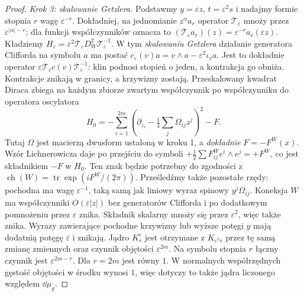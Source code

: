 \begin{proof}
\emph{Krok 3: skalowanie Getzlera.}
Podstawmy \(y=\varepsilon z\),
\(t=\varepsilon^2s\) i nadajmy formie stopnia
\(r\) wagę \(\varepsilon^{-r}\).
Dokładniej, na jednomianie \(z^\alpha a_r\)
operator \(\mathcal T_\varepsilon\) mnoży przez
\(\varepsilon^{|\alpha|-r}\);
dla funkcji współczynników oznacza to
$(\mathcal T_\varepsilon a_r)(z)=\varepsilon^{-r}a_r(\varepsilon z)$.
Kładziemy
\(H_\varepsilon=\varepsilon^2\mathcal T_\varepsilon
D_W^2\mathcal T_\varepsilon^{-1}\).
W tym
\emph{skalowaniu Getzlera} działanie generatora
Clifforda na symbolu \(a\) ma postać
\(c_\varepsilon(v)a=v\wedge a
-\varepsilon^2\iota_v a\).
Jest to dokładnie operator
$\varepsilon\mathcal T_\varepsilon c(v)\mathcal T_\varepsilon^{-1}$:
klin podnosi stopień o jeden, a kontrakcja go obniża.
Kontrakcje znikają w granicy, a krzywizny zostają.
Przeskalowany kwadrat Diraca zbiega na każdym
zbiorze zwartym współczynnik po współczynniku
do operatora oscylatora
\[
 H_0=-\sum_{i=1}^{2m}
       \left(\partial_{z_i}
          -\tfrac14\sum_j\Omega_{ij}z^j\right)^2
       -F.
\]
Tutaj $\Omega$ jest macierzą dwusform ustaloną w kroku 1,
a \emph{dokładnie} $F=-F^W(x)$.
Wzór Lichnerowicza daje po przejściu do symboli
$+\frac12\sum F^W_{ij}e^i\wedge e^j=+F^W$,
co jest składnikiem $-F$ w $H_0$.
Ten znak będzie potrzebny do zgodności z
$\operatorname{ch}(W)=\operatorname{tr}\exp(iF^W/(2\pi))$.
Prześledźmy także pozostałe rzędy:
pochodna ma wagę $\varepsilon^{-1}$, taką samą jak
liniowy wyraz spinowy $y^j\Omega_{ij}$.
Koneksja $W$ ma współczynniki $O(\varepsilon|z|)$
bez generatorów Clifforda i po dodatkowym pomnożeniu
przez $\varepsilon$ znika. Składnik skalarny
mnoży się przez $\varepsilon^2$, więc także znika.
Wyrazy zawierające pochodne krzywizny lub wyższe
potęgi \(y\) mają dodatnią potęgę
\(\varepsilon\) i znikają.
Jądro \(K^\varepsilon_s\) jest otrzymane z
\(K_{\varepsilon^2s}\) przez tę samą zmianę
zmiennych oraz czynnik objętości
\(\varepsilon^{2m}\).
Na symbolu stopnia $r$ łączny czynnik jest
$\varepsilon^{2m-r}$. Dla $r=2m$ jest równy $1$.
W normalnych współrzędnych gęstość objętości w środku wynosi $1$,
więc dotyczy to także jądra liczonego względem $\dd\mu_g$.


\end{proof}
